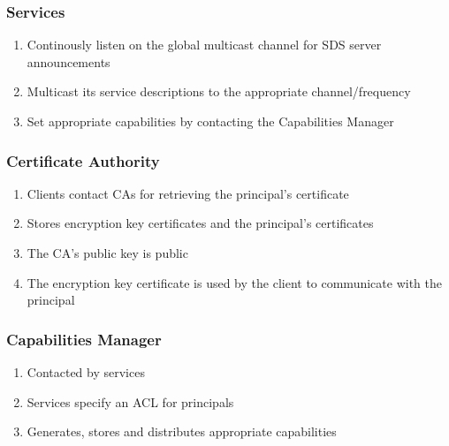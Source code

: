 \documentclass{beamer}
\begin{document}

\begin{frame} %
\frametitle{Services}
\begin{enumerate}
\item \alert<+>{Continously listen on the global multicast channel for SDS server announcements}
\item \alert<+>{Multicast its service descriptions to the appropriate channel/frequency}
\item \alert<+>{Set appropriate capabilities by contacting the Capabilities Manager}
\end{enumerate}
\end{frame}


\begin{frame} %
\frametitle{Certificate Authority}
\begin{enumerate}
\item \alert<+>{Clients contact CAs for retrieving the principal's certificate}
\item \alert<+>{Stores encryption key certificates and the principal's certificates}
\item \alert<+>{The CA's public key is public}
\item \alert<+>{The encryption key certificate is used by the client to communicate with the principal}
\end{enumerate}
\end{frame}


\begin{frame} %
\frametitle{Capabilities Manager}
\begin{enumerate}
\item \alert<+>{Contacted by services}
\item \alert<+>{Services specify an ACL for principals}
\item \alert<+>{Generates, stores and distributes appropriate capabilities}
\end{enumerate}
\end{frame}
\end{document}

